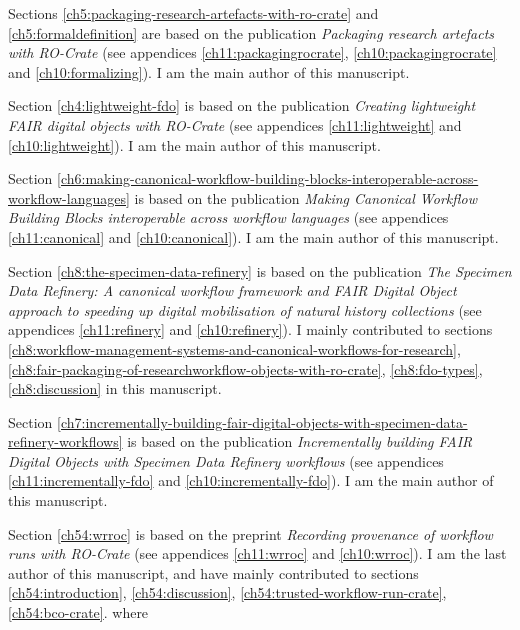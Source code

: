Sections \ref{ch5:packaging-research-artefacts-with-ro-crate} and \vref{ch5:formaldefinition} are based on the publication \emph{Packaging research artefacts with RO-Crate} \cite{Soiland-Reyes 2022} (see appendices \ref{ch11:packagingrocrate}, \ref{ch10:packagingrocrate} and \ref{ch10:formalizing}). I am the main author of this manuscript.

Section \ref{ch4:lightweight-fdo} is based on the publication \emph{Creating lightweight FAIR digital objects with RO-Crate} \cite{10.3897/rio.8.e93937} (see appendices \ref{ch11:lightweight} and \ref{ch10:lightweight}). I am the main author of this manuscript.

Section \ref{ch6:making-canonical-workflow-building-blocks-interoperable-across-workflow-languages} is based on the publication \emph{Making Canonical Workflow Building Blocks interoperable across workflow languages} \cite{Soiland-Reyes 2022b} (see appendices \ref{ch11:canonical} and \ref{ch10:canonical}). I am the main author of this manuscript.

Section \ref{ch8:the-specimen-data-refinery} is based on the publication \emph{The Specimen Data Refinery: A
canonical workflow framework and FAIR Digital Object approach to speeding up digital mobilisation of natural history collections} \cite{Hardisty 2022} (see appendices \ref{ch11:refinery} and \ref{ch10:refinery}). I mainly contributed to sections \ref{ch8:workflow-management-systems-and-canonical-workflows-for-research}, \ref{ch8:fair-packaging-of-researchworkflow-objects-with-ro-crate}, \ref{ch8:fdo-types}, \ref{ch8:discussion} in this manuscript.

Section \ref{ch7:incrementally-building-fair-digital-objects-with-specimen-data-refinery-workflows} is based on the publication \emph{Incrementally building FAIR Digital Objects with Specimen Data
Refinery workflows} \cite{Woolland 2022} (see appendices \ref{ch11:incrementally-fdo} and \ref{ch10:incrementally-fdo}). I am the main author of this manuscript.

Section \ref{ch54:wrroc} is based on the preprint \emph{
Recording provenance of workflow runs with RO-Crate} \cite{workflow-run-crate} (see appendices \ref{ch11:wrroc} and \ref{ch10:wrroc}). I am the last author of this manuscript, and have mainly contributed to sections \ref{ch54:introduction}, \ref{ch54:discussion}, \ref{ch54:trusted-workflow-run-crate}, \ref{ch54:bco-crate}.
where